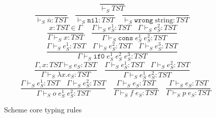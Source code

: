 \begin{figure}
\[
\frac{}{\vdash_{S}TST}
\]
\bigskip
\[
\frac{}{\vdash_{S}\overline{n}:TST}
\quad
\frac{}{\vdash_{S}\mathtt{nil}:TST}
\quad
\frac{}{\vdash_{S}\mathtt{wrong}\;\mathrm{string}:TST}
\]
\[
\frac{x:TST\in\Gamma}{\Gamma\vdash_{S}x:TST}
\quad
\frac{\Gamma\vdash_{S}e_{S}^{1}:TST\quad\Gamma\vdash_{S}e_{S}^{2}:TST}{\Gamma\vdash_{S}\mathtt{cons}\;e_{S}^{1}\;e_{S}^{2}:TST}
\]
\[
\frac{\Gamma\vdash_{S}e_{S}^{1}:TST\quad\Gamma\vdash_{S}e_{S}^{2}:TST\quad\Gamma\vdash_{S}e_{S}^{3}:TST}{\Gamma\vdash_{S}\mathtt{if0}\;e_{S}^{1}\;e_{S}^{2}\;e_{S}^{3}:TST}
\]
\[
\frac{\Gamma,x:TST\vdash_{S}e_{S}:TST}{\Gamma\vdash_{S}\lambda x.e_{S}:TST}
\quad
\frac{\Gamma\vdash_{S}e_{S}^{1}:TST\quad\Gamma\vdash_{S}e_{S}^{2}:TST}{\Gamma\vdash_{S}e_{S}^{1}\;e_{S}^{2}:TST}
\]
\[
\quad
\frac{\Gamma\vdash_{S}e_{S}^{1}:TST\quad\Gamma\vdash_{S}e_{S}^{2}:TST}{\Gamma\vdash_{S}o\;e_{S}^{1}\;e_{S}^{2}:TST}
\quad
\frac{\Gamma\vdash_{S}e_{S}:TST}{\Gamma\vdash_{S}f\;e_{S}:TST}
\quad
\frac{\Gamma\vdash_{S}e_{S}:TST}{\Gamma\vdash_{S}p\;e_{S}:TST}
\]
\caption{Scheme core typing rules}
\label{sctr}
\end{figure}